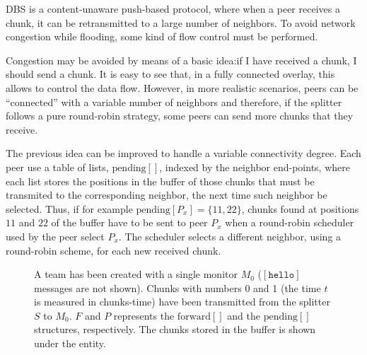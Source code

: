 
\label{sec:chunk_flooding}

\begin{comment}
\begin{figure*}
  \fig{300}{3cm}{peer_chunk_flooding}
  \caption{Chunk flooding at peers.\label{fig:peer_chunk_flooding}}
\end{figure*}
\end{comment}

DBS is a content-unaware push-based protocol, where when a peer
receives a chunk, it can be retransmitted to a large number of
neighbors. To avoid network congestion while flooding, some kind of
flow control must be performed.


Congestion may be avoided by means of a basic idea:\textsf{if I have
  received a chunk, I should send a chunk}. It is easy to see that, in
a fully connected overlay, this allows to control the data
flow. However, in more realistic scenarios, peers can be ``connected''
with a variable number of neighbors and therefore, if the splitter
follows a pure round-robin strategy, some peers can send more chunks
that they receive.

The previous idea can be improved to handle a variable connectivity
degree. Each peer use a table of lists, $\text{pending}[]$, indexed by
the neighbor end-points, where each list stores the positions in the
buffer of those chunks that must be transmited to the corresponding
neighbor, the next time such neighbor be selected. Thus, if for
example $\text{pending}[P_x]=\{11,22\}$, chunks found at positions
$11$ and $22$ of the buffer have to be sent to peer $P_x$ when a
round-robin scheduler used by the peer select $P_x$. The scheduler
selects a different neighbor, using a round-robin scheme, for each new
received chunk.

\begin{figure}
   \caption{A team has been created with a
    single monitor $M_0$ ($[\mathtt{hello}]$ messages are not
    shown). Chunks with numbers 0 and 1 (the time $t$ is measured in
    chunks-time) have been transmitted from the splitter $S$ to
    $M_0$. $F$ and $P$ represents the $\text{forward}[]$ and the
    $\text{pending}[]$ structures, respectively. The chunks stored in
    the buffer is shown under the entity.\label{fig:team_0}}
\end{figure}

